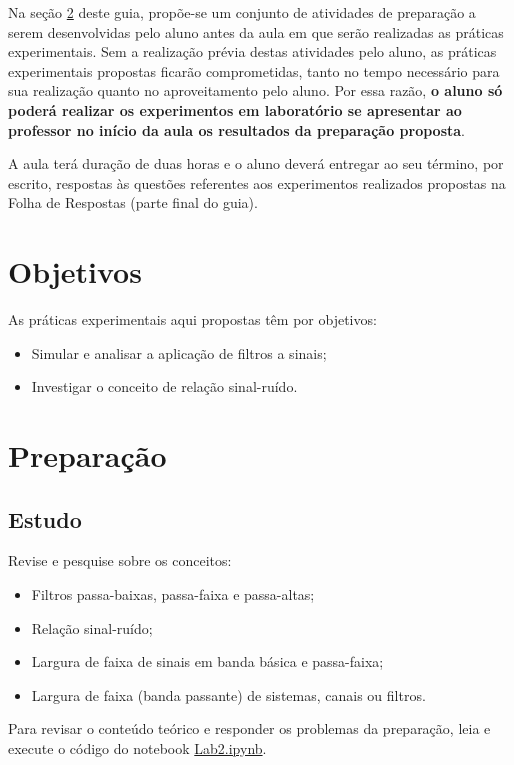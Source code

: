 \documentclass[12pt,addpoints]{exam}
\begin{document}
Na seção \ref{sect:Preparacao} deste guia, propõe-se um conjunto de atividades de preparação a serem desenvolvidas pelo aluno antes da aula em que serão realizadas as práticas experimentais. Sem a realização prévia destas atividades pelo aluno, as práticas experimentais propostas ficarão comprometidas, tanto no tempo necessário para sua realização quanto no aproveitamento pelo aluno. Por essa razão, \textbf{o aluno só poderá realizar os experimentos em laboratório se apresentar ao professor no início da aula os resultados da preparação proposta}. 

A aula terá duração de duas horas e o aluno deverá entregar ao seu término, por escrito, respostas às questões referentes aos experimentos realizados propostas na Folha de Respostas (parte final do guia).

\section{Objetivos}

As práticas experimentais aqui propostas têm por objetivos:
\begin{itemize}
    \item Simular e analisar a aplicação de filtros a sinais;
    \item Investigar o conceito de relação sinal-ruído.
\end{itemize}

\section{Preparação} \label{sect:Preparacao}

\subsection{Estudo}

Revise e pesquise sobre os conceitos:
\begin{itemize}
    \item Filtros passa-baixas, passa-faixa e passa-altas;
    \item Relação sinal-ruído;
    \item Largura de faixa de sinais em banda básica e passa-faixa; 
    \item Largura de faixa (banda passante) de sistemas, canais ou filtros.
\end{itemize}

Para revisar o conteúdo teórico e responder os problemas da preparação, leia e execute o código do notebook \href{https://github.com/edsonportosilva/LPC/blob/master/Jupyter/Lab2/Lab2.ipynb}{Lab2.ipynb}.
\end{document}
